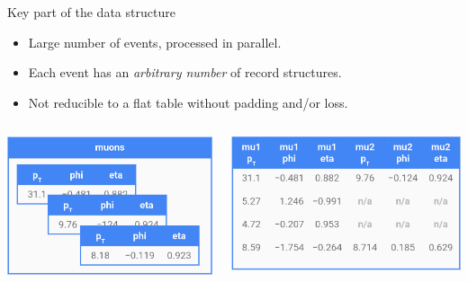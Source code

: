 \documentclass[aspectratio=169]{beamer}
\begin{document}
\begin{frame}{Key part of the data structure}
\Large
\vspace{0.25 cm}
\begin{itemize}
\item Large number of events, processed in parallel.
\item Each event has an {\it arbitrary number} of record structures.
\item Not reducible to a flat table without padding and/or loss.
\end{itemize}

\vspace{0.25 cm}
\begin{columns}
\includegraphics[width=\linewidth]{muons-as-objects.png}

\includegraphics[width=\linewidth]{muons-as-a-table.png}
\end{columns}
\end{frame}
\end{document}

